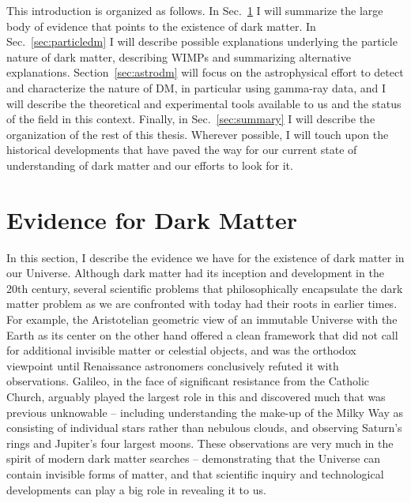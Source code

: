 This introduction is organized as follows. In Sec.~\ref{sec:evidence} I will summarize the large body of evidence that points to the existence of dark matter. In Sec.~\ref{sec:particledm} I will describe possible explanations underlying the particle nature of dark matter, describing WIMPs and summarizing alternative explanations. Section~\ref{sec:astrodm} will focus on the astrophysical effort to detect and characterize the nature of DM, in particular using gamma-ray data, and I will describe the theoretical and experimental tools available to us and the status of the field in this context. Finally, in Sec.~\ref{sec:summary} I will describe the organization of the rest of this thesis. Wherever possible, I will touch upon the historical developments that have paved the way for our current state of understanding of dark matter and our efforts to look for it.

\section{Evidence for Dark Matter}
\label{sec:evidence}

In this section, I describe the evidence we have for the existence of dark matter in our Universe. Although dark matter had its inception and development in the 20th century, several scientific problems that philosophically encapsulate the dark matter problem as we are confronted with today had their roots in earlier times. 
For example, the Aristotelian geometric view of an immutable Universe with the Earth as its center on the other hand offered a clean framework that did not call for additional invisible matter or celestial objects, and was the orthodox viewpoint until Renaissance astronomers conclusively refuted it with observations. Galileo, in the face of significant resistance from the Catholic Church, arguably played the largest role in this and discovered much that was previous unknowable -- including understanding the make-up of the Milky Way as consisting of individual stars rather than nebulous clouds, and observing Saturn's rings and Jupiter's four largest moons. These observations are very much in the spirit of modern dark matter searches -- demonstrating that the Universe can contain invisible forms of matter, and that scientific inquiry and technological developments can play a big role in revealing it to us.



